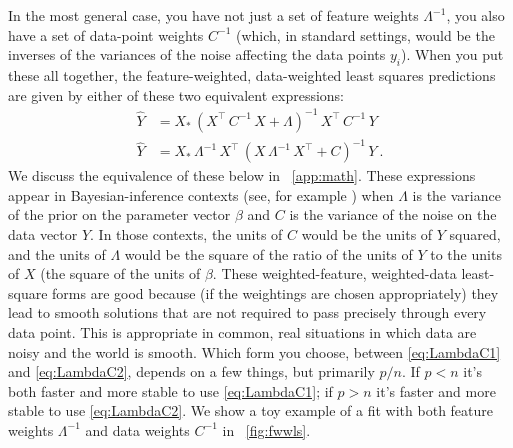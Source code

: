 \documentclass[12pt,letterpaper]{article}
\begin{document}
In the most general case, you have not just a set of feature weights $\Lambda^{-1}$, you also have a set of data-point weights $C^{-1}$ (which, in standard settings, would be the inverses of the variances of the noise affecting the data points $y_i$).
When you put these all together, the feature-weighted, data-weighted least squares predictions are given by either of these two equivalent expressions:
\begin{align}\label{eq:LambdaC1}
    \hat{Y} &= X_\ast\,(X^\top\,C^{-1}\,X + \Lambda)^{-1}\,X^\top\,C^{-1}\,Y
    \\ \label{eq:LambdaC2}
    \hat{Y} &= X_\ast\,\Lambda^{-1}\,X^\top\,(X\,\Lambda^{-1}\,X^\top + C)^{-1}\,Y
    ~.
\end{align}
We discuss the equivalence of these below in \appendixname~\ref{app:math}. These expressions appear in Bayesian-inference contexts (see, for example \citealt{products}) when $\Lambda$ is the variance of the prior on the parameter vector $\beta$ and $C$ is the variance of the noise on the data vector $Y$. In those contexts, the units of $C$ would be the units of $Y$ squared, and the units of $\Lambda$ would be the square of the ratio of the units of $Y$ to the units of $X$ (the square of the units of $\beta$. These weighted-feature, weighted-data least-square forms are good because (if the weightings are chosen appropriately) they lead to smooth solutions that are not required to pass precisely through every data point. This is appropriate in common, real situations in which data are noisy and the world is smooth. Which form you choose, between \eqref{eq:LambdaC1} and \eqref{eq:LambdaC2}, depends on a few things, but primarily $p/n$. If $p<n$ it's both faster and more stable to use \eqref{eq:LambdaC1}; if $p>n$ it's faster and more stable to use \eqref{eq:LambdaC2}. We show a toy example of a fit with both feature weights $\Lambda^{-1}$ and data weights $C^{-1}$ in \figurename~\ref{fig:fwwls}.
\end{document}
